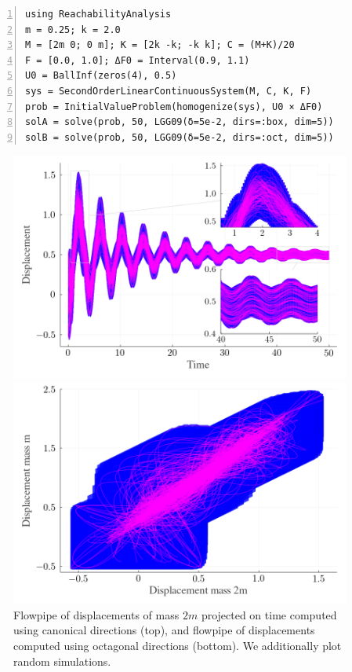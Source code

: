 \documentclass{juliacon}
\begin{document}
\begin{lstlisting}[label=ejemplo, numbers=left, aboveskip=-0.2cm, belowskip=0.8mm]
using ReachabilityAnalysis
m = 0.25; k = 2.0
M = [2m 0; 0 m]; K = [2k -k; -k k]; C = (M+K)/20
F = [0.0, 1.0]; ΔF0 = Interval(0.9, 1.1)
U0 = BallInf(zeros(4), 0.5)
sys = SecondOrderLinearContinuousSystem(M, C, K, F)
prob = InitialValueProblem(homogenize(sys), U0 × ΔF0)
solA = solve(prob, 50, LGG09(δ=5e-2, dirs=:box, dim=5))
solB = solve(prob, 50, LGG09(δ=5e-2, dirs=:oct, dim=5))
\end{lstlisting}

\begin{figure}[tb!]
	\centering
	\includegraphics[width=0.8\linewidth,keepaspectratio]{example/displacement_vs_time}
	
	\includegraphics[width=0.8\linewidth,keepaspectratio]{example/displacement_vs_displacement}
	\caption{Flowpipe of displacements of mass $2m$ projected on time computed using canonical directions  (top), and flowpipe of displacements computed using octagonal directions (bottom). We additionally plot random simulations.}
	\label{fig:example}
\end{figure}
\end{document}
